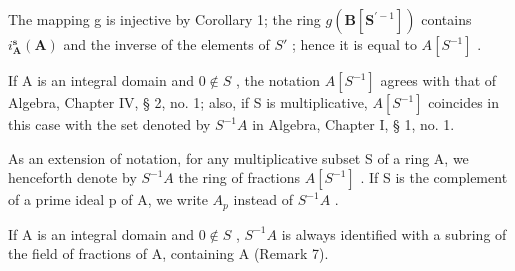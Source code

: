 The mapping g is injective by Corollary 1; the ring \(g(\mathbf{B}[\mathbf{S}^{\prime-1}])\) contains \(i_{\mathbf{A}}^{\mathbf{s}}(\mathbf{A})\) and the inverse of the elements of \(S'\) ; hence it is equal to \(A[S^{-1}]\) .

If A is an integral domain and \(0 \notin S\) , the notation \(A[S^{-1}]\) agrees with that of Algebra, Chapter IV, § 2, no. 1; also, if S is multiplicative, \(A[S^{-1}]\) coincides in this case with the set denoted by \(S^{-1}A\) in Algebra, Chapter I, § 1, no. 1.

As an extension of notation, for any multiplicative subset S of a ring A, we henceforth denote by \(S^{-1}A\) the ring of fractions \(A[S^{-1}]\) . If S is the complement of a prime ideal p of A, we write \(A_{p}\) instead of \(S^{-1}A\) .

If A is an integral domain and \(0 \notin S\) , \(S^{-1}A\) is always identified with a subring of the field of fractions of A, containing A (Remark 7).

